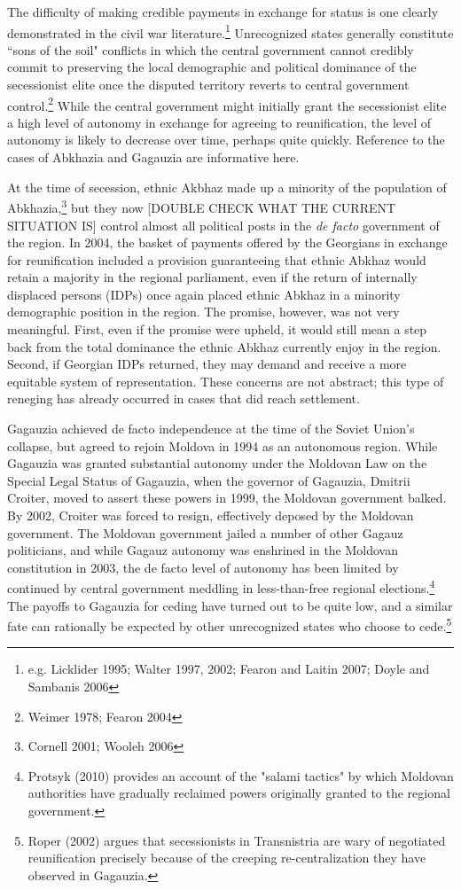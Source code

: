 \documentclass[12pt,letterpaper, notitlepage]{article}
\begin{document}
The difficulty of making credible payments in exchange for status is one clearly demonstrated in the civil war literature.\footnote{e.g. Licklider 1995; Walter 1997, 2002; Fearon and Laitin 2007; Doyle and Sambanis 2006} Unrecognized states generally constitute ``sons of the soil" conflicts in which the central government cannot credibly commit to preserving the local demographic and political dominance of the secessionist elite once the disputed territory reverts to central government control.\footnote{Weimer 1978; Fearon 2004}  While the central government might initially grant the secessionist elite a high level of autonomy in exchange for agreeing to reunification, the level of autonomy is likely to decrease over time, perhaps quite quickly.  Reference to the cases of Abkhazia and Gagauzia are informative here.

At the time of secession, ethnic Akbhaz made up a minority of the population of Abkhazia,\footnote{Cornell 2001; Wooleh 2006} but they now [DOUBLE CHECK WHAT THE CURRENT SITUATION IS] control almost all political posts in the \textit{de facto} government of the region. In 2004, the basket of payments offered by the Georgians in exchange for reunification included a provision guaranteeing that ethnic Abkhaz would retain a majority in the regional parliament, even if the return of internally displaced persons (IDPs) once again placed ethnic Abkhaz in a minority demographic position in the region. The promise, however, was not very meaningful.  First, even if the promise were upheld, it would still mean a step back from the total dominance the ethnic Abkhaz currently enjoy in the region.  Second, if Georgian IDPs returned, they may demand and receive a more equitable system of representation.  These concerns are not abstract; this type of reneging has already occurred in cases that did reach settlement.

Gagauzia achieved de facto independence at the time of the Soviet Union's collapse, but agreed to rejoin Moldova in 1994 as an autonomous region.  While Gagauzia was granted substantial autonomy under the Moldovan Law on the Special Legal Status of Gagauzia, when the governor of Gagauzia, Dmitrii Croiter, moved to assert these powers in 1999, the Moldovan government balked.  By 2002, Croiter was forced to resign, effectively deposed by the Moldovan government.  The Moldovan government jailed a number of other Gagauz politicians, and while Gagauz autonomy was enshrined in the Moldovan constitution in 2003, the de facto level of autonomy has been limited by continued by central government meddling in less-than-free regional elections.\footnote{Protsyk (2010) provides an account of the "salami tactics" by which Moldovan authorities have gradually reclaimed powers originally granted to the regional government.} The payoffs to Gagauzia for ceding have turned out to be quite low, and a similar fate can rationally be expected by other unrecognized states who choose to cede.\footnote{Roper (2002) argues that secessionists in Transnistria are wary of negotiated reunification precisely because of the creeping re-centralization they have observed in Gagauzia.}
\end{document}
